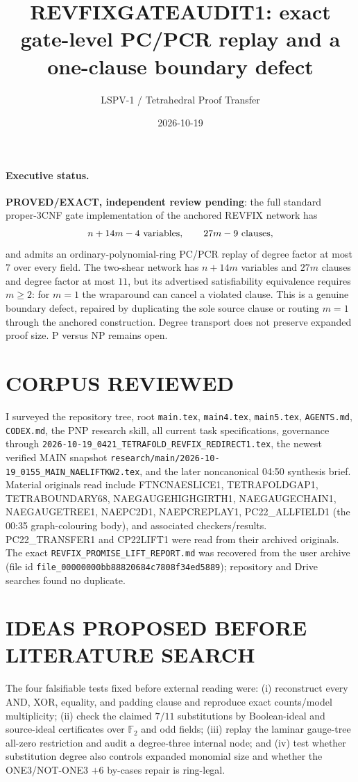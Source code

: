 \documentclass[11pt]{article}
\title{REVFIXGATEAUDIT1: exact gate-level PC/PCR replay and a one-clause boundary defect}
\author{LSPV-1 / Tetrahedral Proof Transfer}
\date{2026-10-19}
\newcommand{\status}[1]{\textbf{#1}}
\begin{document}
\maketitle

\paragraph{Executive status.}
\status{PROVED/EXACT, independent review pending}: the full standard proper-3CNF gate implementation of the anchored REVFIX network has
\[
 n+14m-4\ \hbox{variables},\qquad 27m-9\ \hbox{clauses},
\]
and admits an ordinary-polynomial-ring PC/PCR replay of degree factor at most $7$ over every field.  The two-shear network has $n+14m$ variables and $27m$ clauses and degree factor at most $11$, but its advertised satisfiability equivalence requires $m\geq2$: for $m=1$ the wraparound can cancel a violated clause.  This is a genuine boundary defect, repaired by duplicating the sole source clause or routing $m=1$ through the anchored construction.  Degree transport does not preserve expanded proof size.  P versus NP remains open.

\section*{CORPUS REVIEWED}
I surveyed the repository tree, root \texttt{main.tex}, \texttt{main4.tex}, \texttt{main5.tex}, \texttt{AGENTS.md}, \texttt{CODEX.md}, the PNP research skill, all current task specifications, governance through \texttt{2026-10-19\_0421\_TETRAFOLD\_REVFIX\_REDIRECT1.tex}, the newest verified MAIN snapshot \texttt{research/main/2026-10-19\_0155\_MAIN\_NAELIFTKW2.tex}, and the later noncanonical 04:50 synthesis brief.  Material originals read include FTNCNAESLICE1, TETRAFOLDGAP1, TETRABOUNDARY68, NAEGAUGEHIGHGIRTH1, NAEGAUGECHAIN1, NAEGAUGETREE1, NAEPC2D1, NAEPCREPLAY1, PC22\_ALLFIELD1 (the 00:35 graph-colouring body), and associated checkers/results.  PC22\_TRANSFER1 and CP22LIFT1 were read from their archived originals.  The exact \texttt{REVFIX\_PROMISE\_LIFT\_REPORT.md} was recovered from the user archive (file id \texttt{file\_00000000bb88820684c7808f34ed5889}); repository and Drive searches found no duplicate.

\section*{IDEAS PROPOSED BEFORE LITERATURE SEARCH}
The four falsifiable tests fixed before external reading were: (i) reconstruct every AND, XOR, equality, and padding clause and reproduce exact counts/model multiplicity; (ii) check the claimed $7/11$ substitutions by Boolean-ideal and source-ideal certificates over $\mathbb F_2$ and odd fields; (iii) replay the laminar gauge-tree all-zero restriction and audit a degree-three internal node; and (iv) test whether substitution degree also controls expanded monomial size and whether the ONE3/NOT-ONE3 $+6$ by-cases repair is ring-legal.
\end{document}
